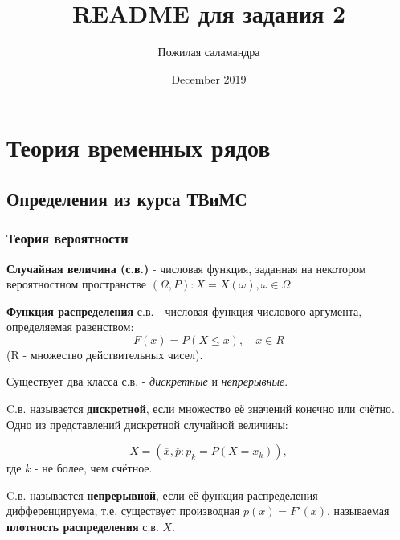 \documentclass{article}
\title{README для задания 2}
\author{Пожилая саламандра}
\date{December 2019}
\begin{document}
\maketitle

\tableofcontents
\newpage
 
 
\section{Теория временных рядов}
  
  \subsection{Определения из курса ТВиМС}
  
    \subsubsection{Теория вероятности}
     
      \textbf{Случайная величина (с.в.)} - числовая функция, заданная на некотором вероятностном пространстве $(\Omega, P): X = X(\omega), \omega \in \Omega.$\par
      
      \textbf{Функция распределения} с.в. - числовая функция числового аргумента, определяемая равенством:
      \begin{equation}
        F(x) = P(X \leq x), \quad x \in R
      \end{equation}
      (R - множество действительных чисел).\par
      
      Существует два класса с.в. - \textsl{дискретные} и \textsl{непрерывные}.\par
      
      C.в. называется \textbf{дискретной}, если множество её значений конечно или счётно. Одно из представлений дискретной случайной величины:
      
      \begin{equation}
        X = (\overline{x}, \overline{p} : p_k = P(X = x_k)),
      \end{equation}
      где $k$ - не более, чем счётное.\par
      
      C.в. называется \textbf{непрерывной}, если её функция распределения дифференцируема, т.е. существует производная $p(x) = F'(x)$, называемая \textbf{плотность распределения} с.в. $X$.\par
      
\end{document}
